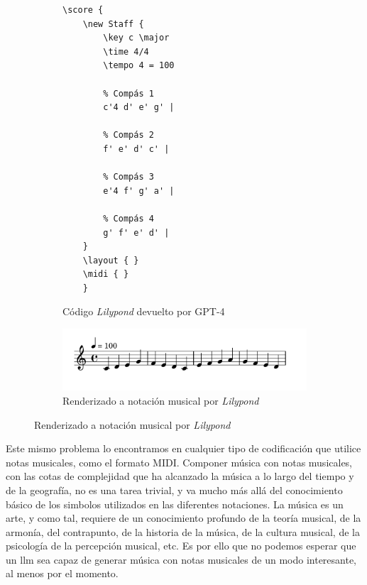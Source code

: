 \begin{figure}[h]
    \caption[Melodía de 4 compases generada por GPT-4, al estilo de Bach]{Melodía de 4 compases generada por GPT-4, al estilo de Bach. El \gls{llm} la entregó en formato Lilypond.}
    \centering
    \begin{subfigure}{.48\textwidth}
        \centering
        \begin{mdframed}
        \begin{verbatim}
\score {
    \new Staff {
        \key c \major
        \time 4/4
        \tempo 4 = 100
    
        % Compás 1
        c'4 d' e' g' |
    
        % Compás 2
        f' e' d' c' |
    
        % Compás 3
        e'4 f' g' a' |
    
        % Compás 4
        g' f' e' d' |
    }
    \layout { }
    \midi { }
    }
        \end{verbatim}
        \end{mdframed}
        \caption{Código \emph{Lilypond} devuelto por GPT-4}
      \end{subfigure} \hfill

      \vspace{5mm} %

      \begin{subfigure}{.75\textwidth}
        \centering
        \includegraphics[width=1\textwidth]{./figuras/melodia_bach_estilo.png}
        \caption{Renderizado a notación musical por \emph{Lilypond}}
      \end{subfigure}\hfill
    \source{\propio}
    \label{fig:melodia_bach}
\end{figure}

Este mismo problema lo encontramos en cualquier tipo de codificación que utilice notas musicales, como el formato MIDI.
Componer música con notas musicales, con las cotas de complejidad que ha alcanzado la música a lo largo del tiempo y de la geografía, no es una tarea trivial, y va mucho más allá del conocimiento básico de los simbolos utilizados en las diferentes notaciones. La música es un arte, y como tal, requiere de un conocimiento profundo de la teoría musical, de la armonía, del contrapunto, de la historia de la música, de la cultura musical, de la psicología de la percepción musical, etc. Es por ello que no podemos esperar que un \gls{llm} sea capaz de generar música con notas musicales de un modo interesante, al menos por el momento.

